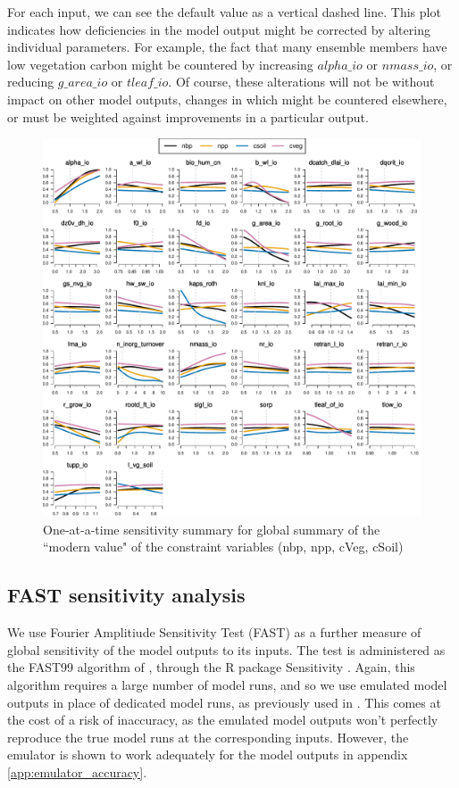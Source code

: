\documentclass[gmd, manuscript]{copernicus}
\begin{document}
For each input, we can see the default value as a vertical dashed line. This plot indicates how deficiencies in the model output might be corrected by altering individual parameters. For example, the fact that many ensemble members have low vegetation carbon might be countered by increasing $alpha\_io$ or $nmass\_io$, or reducing $g\_area\_io$ or $tleaf\_io$. Of course, these alterations will not be without impact on other model outputs, changes in which might be countered elsewhere, or must be weighted against improvements in a particular output.

\begin{figure}[t]
\includegraphics[width=12cm]{./figs/fig09.pdf}
\caption{One-at-a-time sensitivity summary for global summary of the ``modern value" of the constraint variables (nbp, npp, cVeg, cSoil)}
\label{fig:Y_oaat_const_level1a_wave01_scaled_norm}
\end{figure}

\subsection{FAST sensitivity analysis}\label{ssec:sa_fast}

We use Fourier Amplitiude Sensitivity Test (FAST) as a further measure of global sensitivity of the model outputs to its inputs. The test is administered as the FAST99 algorithm of \cite{saltelli1999sensitivity}, through the R package Sensitivity \citep{Rpackage2015sensitivity}. Again, this algorithm requires a large number of model runs, and so we use emulated model outputs in place of dedicated model runs, as previously used in \cite{mcneall2020correcting, mcneall2016impact, carslaw2013large}. This comes at the cost of a risk of inaccuracy, as the emulated model outputs won't perfectly reproduce the true model runs at the corresponding inputs. However, the emulator is shown to work adequately for the model outputs in appendix \ref{app:emulator_accuracy}. 
\end{document}
